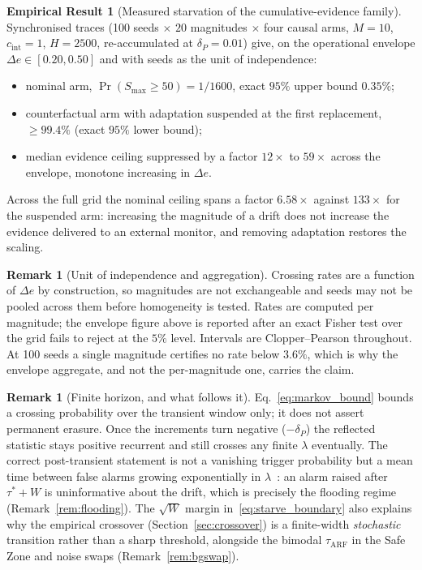 \documentclass[10pt,conference]{IEEEtran}
\theoremstyle{definition}
\newtheorem{remark}[theorem]{Remark}
\newtheorem{empresult}{Empirical Result}
\newcommand{\SixSeeds}{100}                  %
\newcommand{\SixHorizon}{2500}               %
\newcommand{\DeltaPtext}{0.01}               %
\newcommand{\FullSpreadGrid}{6.58}           %
\newcommand{\FrozenSpreadGrid}{133}          %
\newcommand{\SuppressLo}{12}                 %
\newcommand{\SuppressHi}{59}                 %
\newcommand{\StarvFullK}{1}                  %
\newcommand{\StarvFullN}{1600}               %
\newcommand{\StarvFullUpper}{0.35}           %
\newcommand{\StarvFrozenLower}{99.4}         %
\newcommand{\EnvLo}{0.20}\newcommand{\EnvHi}{0.40}
\begin{document}
\begin{empresult}[Measured starvation of the cumulative-evidence family]\label{res:starvation}
  Synchronised traces (\SixSeeds{} seeds $\times$ $20$ magnitudes $\times$ four causal arms, $M = 10$, $c_{\mathrm{int}} = 1$, $H = \SixHorizon$, re-accumulated at $\delta_P = \DeltaPtext$) give, on the operational envelope $\Delta e \in [\EnvLo, 0.50]$ and with seeds as the unit of independence:
  \begin{itemize}[leftmargin=*,topsep=2pt,itemsep=1pt]
    \item nominal arm, $\Pr(S_{\max} \ge 50) = \StarvFullK/\StarvFullN$, exact $95\%$ upper bound $\StarvFullUpper\%$;
    \item counterfactual arm with adaptation suspended at the first replacement, $\ge \StarvFrozenLower\%$ (exact $95\%$ lower bound);
    \item median evidence ceiling suppressed by a factor $\SuppressLo\times$ to $\SuppressHi\times$ across the envelope, monotone increasing in $\Delta e$.
  \end{itemize}
  Across the full grid the nominal ceiling spans a factor $\FullSpreadGrid\times$ against $\FrozenSpreadGrid\times$ for the suspended arm: increasing the magnitude of a drift does not increase the evidence delivered to an external monitor, and removing adaptation restores the scaling.
\end{empresult}

\begin{remark}[Unit of independence and aggregation]\label{rem:aggregation}
  Crossing rates are a function of $\Delta e$ by construction, so magnitudes are not exchangeable and seeds may not be pooled across them before homogeneity is tested. Rates are computed per magnitude; the envelope figure above is reported after an exact Fisher test over the grid fails to reject at the $5\%$ level. Intervals are Clopper--Pearson throughout. At \SixSeeds{} seeds a single magnitude certifies no rate below $3.6\%$, which is why the envelope aggregate, and not the per-magnitude one, carries the claim.
\end{remark}

\begin{remark}[Finite horizon, and what follows it]\label{rem:sufficient}
  Eq.~\eqref{eq:markov_bound} bounds a crossing probability over the transient window only; it does not assert permanent erasure. Once the increments turn negative ($-\delta_P$) the reflected statistic stays positive recurrent and still crosses any finite $\lambda$ eventually. The correct post-transient statement is not a vanishing trigger probability but a mean time between false alarms growing exponentially in $\lambda$~\cite{tartakovsky_2014,page_1954}: an alarm raised after $\tau^* + W$ is uninformative about the drift, which is precisely the flooding regime (Remark~\ref{rem:flooding}). The $\sqrt{W}$ margin in~\eqref{eq:starve_boundary} also explains why the empirical crossover (Section~\ref{sec:crossover}) is a finite-width \emph{stochastic} transition rather than a sharp threshold, alongside the bimodal $\tau_{\mathrm{ARF}}$ in the Safe Zone and noise swaps (Remark~\ref{rem:bgswap}).
\end{remark}
\end{document}

